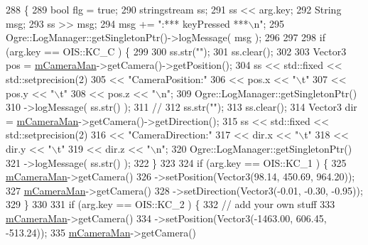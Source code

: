 \begin{DoxyCode}
288 \{
289     \textcolor{keywordtype}{bool} flg = \textcolor{keyword}{true};
290     stringstream ss;
291     ss << arg.key;
292     String msg;
293     ss >> msg;
294     msg += \textcolor{stringliteral}{":*** keyPressed ***\(\backslash\)n"};
295     Ogre::LogManager::getSingletonPtr()->logMessage( msg );
296 
297     
298     \textcolor{keywordflow}{if} (arg.key == OIS::KC\_C ) \{
299         
300         ss.str(\textcolor{stringliteral}{""});
301         ss.clear();
302         
303         Vector3 pos = \hyperlink{class_base_application_a9ae38dea6316058549151fff66a91fcd}{mCameraMan}->getCamera()->getPosition(); 
304         ss << std::fixed << std::setprecision(2) 
305             << \textcolor{stringliteral}{"CameraPosition:"} 
306             << pos.x << \textcolor{stringliteral}{"\(\backslash\)t"} 
307             << pos.y << \textcolor{stringliteral}{"\(\backslash\)t"} 
308             << pos.z << \textcolor{stringliteral}{"\(\backslash\)n"};
309         Ogre::LogManager::getSingletonPtr()
310             ->logMessage( ss.str() );
311         \textcolor{comment}{//}
312         ss.str(\textcolor{stringliteral}{""});
313         ss.clear();
314         Vector3 dir = \hyperlink{class_base_application_a9ae38dea6316058549151fff66a91fcd}{mCameraMan}->getCamera()->getDirection();
315         ss << std::fixed << std::setprecision(2) 
316             << \textcolor{stringliteral}{"CameraDirection:"} 
317             << dir.x << \textcolor{stringliteral}{"\(\backslash\)t"} 
318             << dir.y << \textcolor{stringliteral}{"\(\backslash\)t"} 
319             << dir.z << \textcolor{stringliteral}{"\(\backslash\)n"};
320         Ogre::LogManager::getSingletonPtr()
321             ->logMessage( ss.str() );
322     \}
323 
324     \textcolor{keywordflow}{if} (arg.key == OIS::KC\_1 ) \{
325         \hyperlink{class_base_application_a9ae38dea6316058549151fff66a91fcd}{mCameraMan}->getCamera()
326             ->setPosition(Vector3(98.14,    450.69, 964.20));
327         \hyperlink{class_base_application_a9ae38dea6316058549151fff66a91fcd}{mCameraMan}->getCamera()
328             ->setDirection(Vector3(-0.01,   -0.30,  -0.95));
329     \}
330 
331     \textcolor{keywordflow}{if} (arg.key == OIS::KC\_2 ) \{
332         \textcolor{comment}{// add your own stuff}
333         \hyperlink{class_base_application_a9ae38dea6316058549151fff66a91fcd}{mCameraMan}->getCamera()
334             ->setPosition(Vector3(-1463.00, 606.45, -513.24));
335         \hyperlink{class_base_application_a9ae38dea6316058549151fff66a91fcd}{mCameraMan}->getCamera()

\end{DoxyCode}
